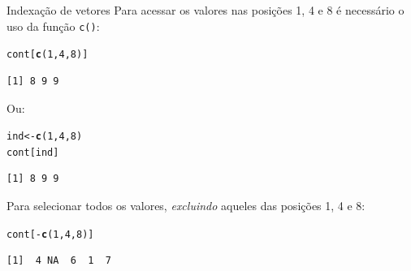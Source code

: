 \documentclass[10pt,handout]{beamer}\usepackage[]{graphicx}\usepackage[]{color}
\makeatletter
\newcommand{\hlnum}[1]{\textcolor[rgb]{0.686,0.059,0.569}{#1}}%
\newcommand{\hlopt}[1]{\textcolor[rgb]{0,0,0}{#1}}%
\newcommand{\hlstd}[1]{\textcolor[rgb]{0.345,0.345,0.345}{#1}}%
\newcommand{\hlkwb}[1]{\textcolor[rgb]{0.69,0.353,0.396}{#1}}%
\newcommand{\hlkwd}[1]{\textcolor[rgb]{0.282,0.239,0.545}{\textbf{#1}}}%
\newenvironment{kframe}{%
 \def\at@end@of@kframe{}%
 \ifinner\ifhmode%
  \def\at@end@of@kframe{\end{minipage}}%
  \begin{minipage}{\columnwidth}%
 \fi\fi%
 \def\FrameCommand##1{\hskip\@totalleftmargin \hskip-\fboxsep
 \colorbox{shadecolor}{##1}\hskip-\fboxsep
     \hskip-\linewidth \hskip-\@totalleftmargin \hskip\columnwidth}%
 \MakeFramed {\advance\hsize-\width
   \@totalleftmargin\z@ \linewidth\hsize
   \@setminipage}}%
 {\par\unskip\endMakeFramed%
 \at@end@of@kframe}
\newenvironment{knitrout}{}{} %
\makeatother
\begin{document}
\begin{frame}[fragile]{Indexação de vetores}
Para acessar os valores nas posições 1, 4 e 8 é necessário o uso da
função \texttt{c()}:
\begin{knitrout}\small
{}\color{fgcolor}\begin{kframe}
\begin{alltt}
\hlstd{cont[}\hlkwd{c}\hlstd{(}\hlnum{1}\hlstd{,} \hlnum{4}\hlstd{,} \hlnum{8}\hlstd{)]}
\end{alltt}
\begin{verbatim}
[1] 8 9 9
\end{verbatim}
\end{kframe}
\end{knitrout}

Ou:
\begin{knitrout}\small
{}\color{fgcolor}\begin{kframe}
\begin{alltt}
\hlstd{ind} \hlkwb{<-} \hlkwd{c}\hlstd{(}\hlnum{1}\hlstd{,} \hlnum{4}\hlstd{,} \hlnum{8}\hlstd{)}
\hlstd{cont[ind]}
\end{alltt}
\begin{verbatim}
[1] 8 9 9
\end{verbatim}
\end{kframe}
\end{knitrout}

Para selecionar todos os valores, \emph{excluindo} aqueles das posições
1, 4 e 8:
\begin{knitrout}\small
{}\color{fgcolor}\begin{kframe}
\begin{alltt}
\hlstd{cont[}\hlopt{-}\hlkwd{c}\hlstd{(}\hlnum{1}\hlstd{,} \hlnum{4}\hlstd{,} \hlnum{8}\hlstd{)]}
\end{alltt}
\begin{verbatim}
[1]  4 NA  6  1  7
\end{verbatim}
\end{kframe}
\end{knitrout}

\end{frame}
\end{document}
